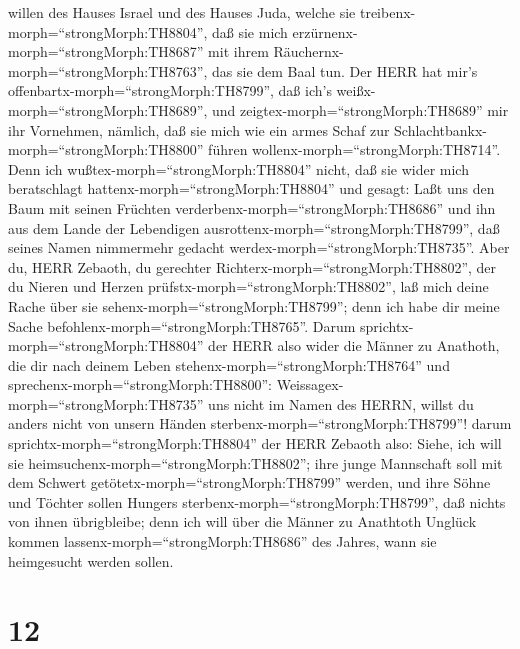 willen des Hauses Israel und des Hauses Juda, welche sie
treibenx-morph=``strongMorph:TH8804'', daß sie mich
erzürnenx-morph=``strongMorph:TH8687'' mit ihrem
Räuchernx-morph=``strongMorph:TH8763'', das sie dem Baal tun.
 Der HERR hat mir's
offenbartx-morph=``strongMorph:TH8799'', daß ich's
weißx-morph=``strongMorph:TH8689'', und
zeigtex-morph=``strongMorph:TH8689'' mir ihr Vornehmen, 
nämlich, daß sie mich wie ein armes Schaf zur
Schlachtbankx-morph=``strongMorph:TH8800'' führen
wollenx-morph=``strongMorph:TH8714''. Denn ich
wußtex-morph=``strongMorph:TH8804'' nicht, daß sie wider mich
beratschlagt hattenx-morph=``strongMorph:TH8804'' und gesagt: Laßt uns
den Baum mit seinen Früchten verderbenx-morph=``strongMorph:TH8686'' und
ihn aus dem Lande der Lebendigen
ausrottenx-morph=``strongMorph:TH8799'', daß seines Namen nimmermehr
gedacht werdex-morph=``strongMorph:TH8735''.  Aber du, HERR
Zebaoth, du gerechter Richterx-morph=``strongMorph:TH8802'', der du
Nieren und Herzen prüfstx-morph=``strongMorph:TH8802'', laß mich deine
Rache über sie sehenx-morph=``strongMorph:TH8799''; denn ich habe dir
meine Sache befohlenx-morph=``strongMorph:TH8765''.  Darum
sprichtx-morph=``strongMorph:TH8804'' der HERR also wider die Männer zu
Anathoth, die dir nach deinem Leben stehenx-morph=``strongMorph:TH8764''
und sprechenx-morph=``strongMorph:TH8800'':
Weissagex-morph=``strongMorph:TH8735'' uns nicht im Namen des HERRN,
willst du anders nicht von unsern Händen
sterbenx-morph=``strongMorph:TH8799''!  darum
sprichtx-morph=``strongMorph:TH8804'' der HERR Zebaoth also: Siehe, ich
will sie heimsuchenx-morph=``strongMorph:TH8802''; ihre junge Mannschaft
soll mit dem Schwert getötetx-morph=``strongMorph:TH8799'' werden, und
ihre Söhne und Töchter sollen Hungers
sterbenx-morph=``strongMorph:TH8799'', daß nichts von ihnen übrigbleibe;
 denn ich will über die Männer zu Anathtoth Unglück kommen
lassenx-morph=``strongMorph:TH8686'' des Jahres, wann sie heimgesucht
werden sollen.

\hypertarget{section-11}{%
\section{12}\label{section-11}}


